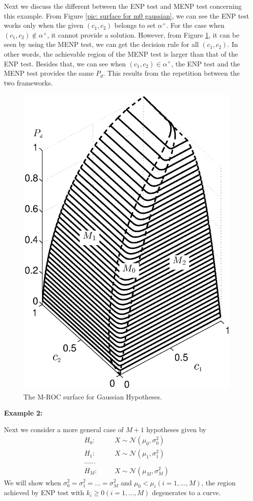 Next we discuss the different between the ENP test and MENP test concerning this example. 
From Figure \ref{pic: surface for m0 gaussian}, we can see the ENP test works only when the given $(c_1, c_2)$ belongs to set $\alpha^+$. For the case when $(c_1, c_2) \notin \alpha^+$, it cannot provide a solution.  However,  from Figure \ref{pic: LJS}, it can be seen by using the MENP test, we can get the decision rule for all $(c_1, c_2)$. 
In other words, the achievable region of the MENP test is larger than that of the ENP test. 
Besides that, we can see when $(c_1, c_2) \in \alpha^+$, the ENP test and the MENP test provides the same $P_d$. This results from the repetition between the two frameworks.  
\begin{figure}[!t]
\centering
\includegraphics[width=12cm, height=16cm]{3/ROC2.eps}
\caption{The M-ROC surface for Gaussian Hypotheses.}
\label{pic: LJS}
\end{figure}

\noindent \textbf{Example 2:}

Next we consider a more general case of $M+1$ hypotheses given by 
\begin{equation}
\label{equ: m+1 Gaussian Hypo}
\begin{split}
H_0:\;\;\;\;\;\;&X\sim \mathcal{N}(\mu_0, \sigma_0^2)\\
H_1:\;\;\;\;\;\;&X\sim \mathcal{N}(\mu_1, \sigma_1^2)\\
  ......\\
H_M:\;\;\;\;\;\;&X\sim \mathcal{N}(\mu_M, \sigma_M^2)
\end{split}
\end{equation}
We will show when $\sigma_0^2 = \sigma_1^2 = ... = \sigma_M^2$ and $\mu_0 < \mu_i (i = 1, ..., M)$, the region achieved by ENP test with $k_i \geq 0 (i = 1, ..., M)$ degenerates to a curve.

